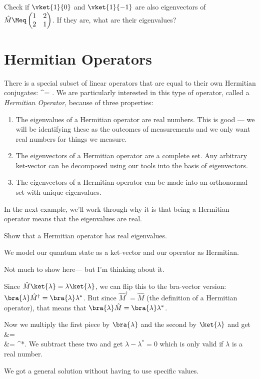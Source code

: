 \begin{exercise}
Check if $\vket{1}{0}$ and $\vket{1}{-1}$ are also eigenvectors of $\hat{M}\Meq\begin{pmatrix}1&2\\2&1\end{pmatrix}$. If they are, what are their eigenvalues?

\end{exercise}

\section{Hermitian Operators}
There is a special subset of linear operators that are equal to their own Hermitian conjugates:
\beq
{}^\dagger = .
\eeq%
We are particularly interested in this type of operator, called a {\em Hermitian Operator}, because of three properties:
\begin{enumerate}
\item The eigenvalues of a Hermitian operator are real numbers. This is good --- we will be identifying these as the outcomes of measurements and we only want real numbers for things we measure.
\item The eigenvectors of a Hermitian operator are a complete set. Any arbitrary ket-vector can be decomposed using our tools into the basis of eigenvectors.
\item The eigenvectors of a Hermitian operator can be made into an orthonormal set with unique eigenvalues. 
\end{enumerate}

In the next example, we'll work through why it is that being a Hermitian operator means that the eigenvalues are real.
\begin{example}
Show that a Hermitian operator has real eigenvalues.

\model We model our quantum state as a ket-vector and our operator as Hermitian.

\vis Not much to show here--- but I'm thinking about it.

\sol Since $\hat{M}\ket{\lambda}=\lambda\ket{\lambda}$, we can flip this to the bra-vector version: $\bra{\lambda}\hat{M}^\dagger=\bra{\lambda}\lambda^*$. But since $\hat{M}^\dagger = \hat{M}$ (the definition of a Hermitian operator), that means that $\bra{\lambda}\hat{M}=\bra{\lambda}\lambda^*$.

Now we multiply the first piece by $\bra{\lambda}$ and the second by $\ket{\lambda}$ and get
\bas
\bra{\lambda}\ket{\lambda} &= \lambda\avg{\lambda|\lambda}\\
\bra{\lambda}\ket{\lambda} &= \lambda^*\avg{\lambda|\lambda}.
\eas
We subtract these two and get $\lambda - \lambda^*=0$ which is only valid if $\lambda$ is a real number.

\assess We got a general solution without having to use specific values.

\end{example}


